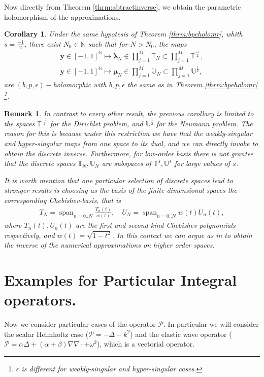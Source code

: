 \documentclass{article}
\newtheorem{corollary}[theorem]{Corollary}
\newtheorem{remark}[theorem]{Remark}
\newcommand{\bmu} {\bm{\mu}}
\newcommand{\IN}{{\mathbb N}}
\newcommand{\IU}{{\mathbb U}}
\newcommand{\IT}{{\mathbb T}}
\newcommand{\cP}{\mathcal{P}}
\newcommand{\bla}{\boldsymbol \lambda}
\newcommand{\by}{\bm{y}}
\DeclareMathOperator{\spn}{span}
\begin{document}
Now directly from Theorem \ref{thrm:abtractinverse}, we obtain the parametric holomorphism of the approximations. 
\begin{corollary}
Under the same hypotesis of Theorem \ref{thrm:bpeholomr}, whith $s = \frac{-1}{2}$, there exist $N_0 \in \IN$ such that for $N>N_0$, the maps 
\begin{align*}
\by \in [-1,1]^{\IN} \mapsto \bla_N \in \prod_{j=1}^M \IT_N \subset \prod_{j=1}^M \IT^{\frac{-1}{2}},\\
\by \in [-1,1]^{\IN} \mapsto \bmu_N \in \prod_{j=1}^M \IU_N \subset \prod_{j=1}^M \IU^{\frac{1}{2}},
\end{align*}
are  $(b,p,\epsilon)-$holomorphic with $b,p,\epsilon$ the same as in Theorem \ref{thrm:bpeholomr} \footnote{ $\epsilon$ is different for weakly-singular and hyper-singular cases.}.
\end{corollary}

\begin{remark}
In contrast to every other result, the previous corollary is limited to the spaces $\IT^{\frac{-1}{2}}$ for the Dirichlet problem, and $\IU^{\frac{1}{2}}$ for the Neumann problem. The reason for this is because under this restriction we have that the weakly-singular and hyper-singular maps from one space to its dual, and we can directly invoke \cite[Theorem 4.2.9]{Sauter:2011} to obtain the discrete inverse. Furthermore, for low-order basis there is not grantee that the discrete spaces $\IT_N, \IU_N$ are subspaces of $\IT^s,\IU^s$ for large values of $s$.

It is worth mention that one particular selection of discrete spaces lead to stronger results is choosing as the basis of the finite dimensional spaces the corresponding Chebishev-basis, that is 
\begin{align*}
T_N =  \spn_{n =0..N} \frac{T_n(t)}{w(t)}, \quad 
U_N =  \spn_{n =0..N} w(t)U_n(t),
\end{align*}
where $T_n(t), U_n(t)$ are the first and second kind Chebishev polynomials respectively, and $w(t) = \sqrt{1-t^2}$. In this context we can argue as in \cite[Chapter 9.8]{saranen2013periodic} to obtain the inverse of the numerical approximations on higher order spaces. 
\end{remark}


\section{Examples for Particular Integral operators.}
\label{sec:examples}
Now we consider particular cases of the operator $\cP$. In particular we will consider the scalar Helmholtz case ($\cP  = -\Delta - k^2$) and the elastic wave operator 
($\cP = 
\alpha \Delta + (\alpha +\beta) \nabla \nabla \cdot  + \omega^2
$), which is a vectorial operator.
\end{document}
